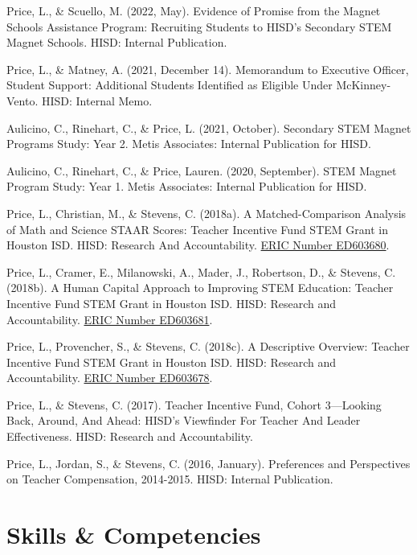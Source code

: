 \documentclass[
  11pt,
]
{article}
\begin{document}
Price, L., \& Scuello, M. (2022, May). Evidence of Promise from the
Magnet Schools Assistance Program: Recruiting Students to HISD's
Secondary STEM Magnet Schools. HISD: Internal Publication.

Price, L., \& Matney, A. (2021, December 14). Memorandum to Executive
Officer, Student Support: Additional Students Identified as Eligible
Under McKinney-Vento. HISD: Internal Memo.

Aulicino, C., Rinehart, C., \& Price, L. (2021, October). Secondary STEM
Magnet Programs Study: Year 2. Metis Associates: Internal Publication
for HISD.

Aulicino, C., Rinehart, C., \& Price, Lauren. (2020, September). STEM
Magnet Program Study: Year 1. Metis Associates: Internal Publication for
HISD.

Price, L., Christian, M., \& Stevens, C. (2018a). A Matched-Comparison
Analysis of Math and Science STAAR Scores: Teacher Incentive Fund STEM
Grant in Houston ISD. HISD: Research And Accountability.
\href{https://eric.ed.gov/}{ERIC Number ED603680}.

Price, L., Cramer, E., Milanowski, A., Mader, J., Robertson, D., \&
Stevens, C. (2018b). A Human Capital Approach to Improving STEM
Education: Teacher Incentive Fund STEM Grant in Houston ISD. HISD:
Research and Accountability. \href{https://eric.ed.gov/}{ERIC Number
ED603681}.

Price, L., Provencher, S., \& Stevens, C. (2018c). A Descriptive
Overview: Teacher Incentive Fund STEM Grant in Houston ISD. HISD:
Research and Accountability. \href{https://eric.ed.gov/}{ERIC Number
ED603678}.

Price, L., \& Stevens, C. (2017). Teacher Incentive Fund, Cohort
3---Looking Back, Around, And Ahead: HISD's Viewfinder For Teacher And
Leader Effectiveness. HISD: Research and Accountability.

Price, L., Jordan, S., \& Stevens, C. (2016, January). Preferences and
Perspectives on Teacher Compensation, 2014-2015. HISD: Internal
Publication.

\section{Skills \& Competencies}\label{skills-competencies}
\end{document}

